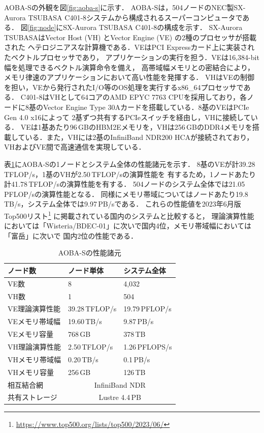 ﻿\documentclass[submit,techrep,noauthor]{ipsj}
\begin{document}
AOBA-Sの外観を図\ref{fig:aoba-s}に示す．
AOBA-Sは，504ノードのNEC製SX-Aurora TSUBASA C401-8システムから構成されるスーパーコンピュータである．
図\ref{fig:node}にSX-Aurora TSUBASA C401-8の構成を示す．
SX-Aurora TSUBASAはVector Host (VH) とVector Engine (VE) の2種のプロセッサが搭載された
ヘテロジニアスな計算機である．VEはPCI Expressカード上に実装されたベクトルプロセッサであり，
アプリケーションの実行を担う．VEは16,384-bit幅を処理できるベクトル演算命令を備え，
高帯域幅メモリとの密結合により，メモリ律速のアプリケーションにおいて高い性能を発揮する．
VHはVEの制御を担い，VEから発行されたI/O等のOS処理を実行するx86\_64プロセッサである．
C401-8はVHとして64コアのAMD EPYC 7763 CPUを採用しており，各ノードに8基のVector Engine Type
30Aカードを搭載している．8基のVEはPCIe Gen 4.0 x16によって
2基ずつ共有するPCIeスイッチを経由し，VHに接続している．
VEは1基あたり96\,GBのHBM2Eメモリを，VHは256\,GBのDDR4メモリを搭載している．また，VHには2基のInfiniBand
NDR200 HCAが接続されており，VHおよびVE間で高速通信を実現している．

表\ref{tbl:aoba-s}にAOBA-Sの1ノードとシステム全体の性能諸元を示す．
8基のVEが計39.28\,TFLOP/s，1基のVHが2.50\,TFLOP/sの演算性能を
有するため，1ノードあたり計41.78\,TFLOP/sの演算性能を有する．
504ノードのシステム全体では21.05\,PFLOP/sの演算性能となる．
同様にメモリ帯域についてはノードあたり19.8\,TB/s，システム全体では9.97\,PB/sである．
これらの性能値を2023年6月版Top500リスト\footnote{\url{https://www.top500.org/lists/top500/2023/06/}}
に掲載されている国内のシステムと比較すると，
理論演算性能においては「Wisteria/BDEC-01」に次いで国内4位，メモリ帯域幅においては「富岳」に次いで
国内2位の性能である．

\begin{table}[tb]
\centering
\caption{AOBA-Sの性能諸元}\label{tbl:aoba-s}
\begin{tabular}{@{}lll@{}}
\toprule
ノード数        & ノード単体     & システム全体           \\ \midrule
VE数            & 8              & 4,032                  \\ \midrule
VH数            & 1              & 504                    \\
VE理論演算性能  & 39.28\,TFLOP/s & 19.79\,PFLOP/s         \\
VEメモリ帯域幅  & 19.60\,TB/s    & 9.87\,PB/s             \\
VEメモリ容量    & 768\,GB        & 378\,TB                \\ \midrule
VH理論演算性能  & 2.50\,TFLOP/s  & 1.26\,PFLOPS/s         \\
VHメモリ帯域幅  & 0.20\,TB/s     & 0.1\,PB/s              \\
VHメモリ容量    & 256\,GB        & 126\,TB                \\ \midrule
相互結合網      & \multicolumn{2}{c}{InfiniBand NDR}      \\
共有ストレージ  & \multicolumn{2}{c}{Lustre 4.4\,PB}      \\ \bottomrule
\end{tabular}
\end{table}
\end{document}

